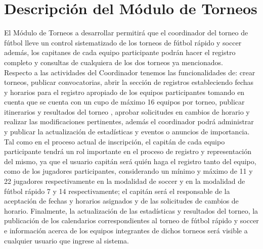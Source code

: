 \section{Descripción del Módulo de Torneos}

El Módulo de Torneos a desarrollar permitirá que el coordinador del torneo de fútbol lleve un control sistematizado de los torneos de fútbol rápido y soccer además, los capitanes de cada equipo participante podrán hacer el registro completo y consultas de cualquiera de los dos torneos ya mencionados.\\

Respecto a las actividades del Coordinador tenemos las funcionalidades de: crear torneos, publicar convocatorias, abrir  la sección de registros estableciendo fechas y horarios para el registro apropiado de los equipos participantes tomando en cuenta que se cuenta con un cupo de máximo 16 equipos por torneo, publicar itinerarios y resultados del torneo , aprobar solicitudes en cambios de horario y realizar las modificaciones pertinentes, además el coordinador podrá administrar y publicar la actualización de estadísticas y eventos o  anuncios de importancia.\\

Tal como en el proceso actual de inscripción, el capitán de cada equipo participante tendrá un rol importante en el proceso de registro y representación del mismo, ya que el usuario capitán será quién haga el registro tanto del equipo, como de los jugadores participantes, considerando un mínimo y máximo de 11 y 22 jugadores respectivamente en la modalidad de soccer y en la modalidad de fútbol rápido 7 y 14 respectivamente; el capitán será el responsable de la aceptación de fechas y horarios asignados y de las solicitudes de cambios de horario.  
Finalmente, la actualización de las estadísticas y resultados del torneo, la publicación de los calendarios correspondientes al torneo de fútbol rápido y soccer e información acerca de los equipos integrantes de dichos torneos será visible a cualquier usuario que ingrese al sistema.

